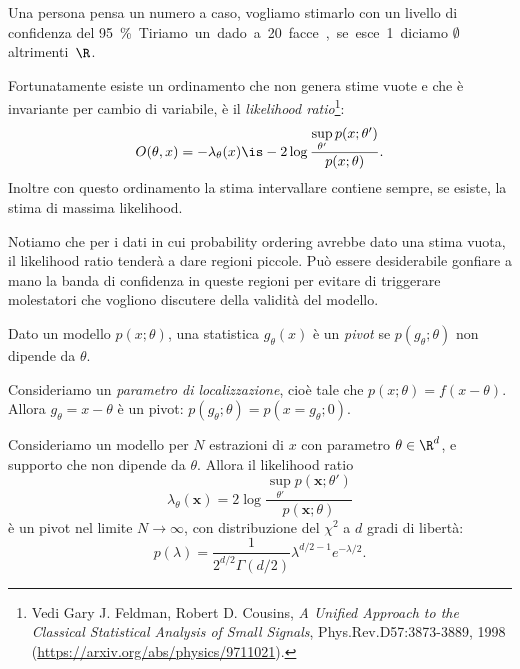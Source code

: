 \begin{example}
	Una persona pensa un numero a caso,
	vogliamo stimarlo con un livello di confidenza del \SI{95}\%.
	Tiriamo un dado a 20 facce,
	se esce 1 diciamo $\emptyset$ altrimenti~$\R$.
\end{example}

Fortunatamente esiste un ordinamento che non genera stime vuote e che è invariante per cambio di variabile,
è il \emph{likelihood ratio}\footnote{Vedi Gary J. Feldman, Robert D. Cousins, \emph{A Unified Approach to the Classical Statistical Analysis of Small Signals},  Phys.Rev.D57:3873-3889, 1998 (\url{https://arxiv.org/abs/physics/9711021}).}:
\begin{equation*}
	O(\theta,x) = -\lambda_\theta(x)
	\is -2\log\frac {\sup\limits_{\theta'} p(x;\theta')} {p(x;\theta)}.
\end{equation*}
Inoltre con questo ordinamento la stima intervallare contiene sempre,
se esiste,
la stima di massima likelihood.

Notiamo che per i dati in cui probability ordering avrebbe dato una stima vuota,
il likelihood ratio tenderà a dare regioni piccole.
Può essere desiderabile gonfiare a mano la banda di confidenza in queste regioni
per evitare di triggerare molestatori che vogliono discutere della validità del modello.

\begin{definition}[Pivot]
	Dato un modello $p(x;\theta)$,
	una statistica $g_\theta(x)$ è un \emph{pivot}
	se $p(g_\theta;\theta)$ non dipende da $\theta$.
\end{definition}

\begin{example}
	Consideriamo un \emph{parametro di localizzazione},
	cioè tale che $p(x;\theta)=f(x-\theta)$.
	Allora $g_\theta=x-\theta$ è un pivot:
	$p(g_\theta;\theta) = p(x=g_\theta;0)$.
\end{example}

\begin{fact}
	\label{th:wilks}
	Consideriamo un modello per $N$ estrazioni di $x$ con parametro $\theta\in\R^d$,
	e supporto che non dipende da $\theta$.
	Allora il likelihood ratio
	\begin{equation*}
		\lambda_\theta(\mathbf x)
		= 2\log\frac {\sup\limits_{\theta'} p(\mathbf x;\theta')} {p(\mathbf x;\theta)}
	\end{equation*}
	è un pivot nel limite $N\to\infty$,
	con distribuzione del $\chi^2$ a $d$ gradi di libertà:
	\begin{equation*}
		p(\lambda)
		= \frac1{2^{d/2}\Gamma(d/2)} \lambda^{d/2-1} e^{-\lambda/2}.
	\end{equation*}
\end{fact}

